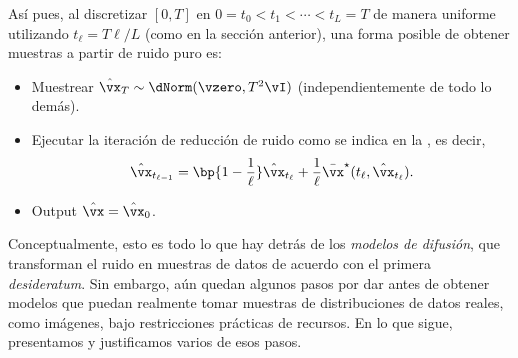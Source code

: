 \documentclass[../../book-main.tex]{subfiles}
\begin{document}
Así pues, al discretizar \([0, T]\) en \(0 = t_{0} < t_{1} < \cdots < t_{L}
= T\) de manera uniforme utilizando \(t_{\ell} = T\ell / L\) (como en la sección anterior),
una forma posible de obtener muestras a partir de ruido puro es:
\begin{itemize}
    \item Muestrear \(\hat{\vx}_{T} \sim \dNorm(\vzero, T^{2}\vI)\)
        (independientemente de todo lo demás).
    \item Ejecutar la iteración de reducción de ruido como se indica en la
        , es decir, 
        \begin{equation}\label{eq:denoising-iteration-basic}
            \hat{\vx}_{t_{\ell - 1}} = \bp{1 -
            \frac{1}{\ell}}\hat{\vx}_{t_{\ell}} +
            \frac{1}{\ell}\bar{\vx}^{\star}(t_{\ell}, \hat{\vx}_{t_{\ell}}).
        \end{equation}
    \item Output \(\hat{\vx} = \hat{\vx}_{0}\).
\end{itemize}
Conceptualmente, esto es todo lo que hay detrás de los \textit{modelos de difusión},
que transforman el ruido en muestras de datos de acuerdo con el primera \textit{desideratum}.
Sin embargo, aún quedan algunos pasos por dar antes de obtener modelos que
puedan realmente tomar muestras de distribuciones de datos reales, como imágenes, bajo
restricciones prácticas de recursos. En lo que sigue, presentamos y
justificamos varios de esos pasos.
\end{document}
